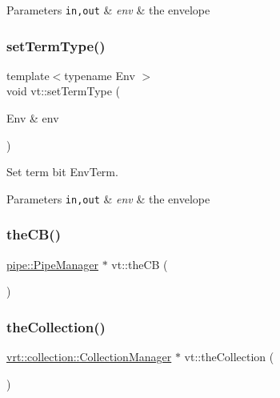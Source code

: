 \begin{DoxyParams}[1]{Parameters}
\mbox{\tt in,out}  & {\em env} & the envelope \\
\hline
\end{DoxyParams}
\mbox{\label{namespacevt_aa42d7e0adc8b283dd10602ece422699d}} 
\subsubsection{\texorpdfstring{set\+Term\+Type()}{setTermType()}}
{\footnotesize\ttfamily template$<$typename Env $>$ \\
void vt\+::set\+Term\+Type (\begin{DoxyParamCaption}\item[{Env \&}]{env }\end{DoxyParamCaption})\hspace{0.3cm}{\ttfamily [inline]}}



Set term bit {\ttfamily Env\+Term}. 


\begin{DoxyParams}[1]{Parameters}
\mbox{\tt in,out}  & {\em env} & the envelope \\
\hline
\end{DoxyParams}
\mbox{\label{namespacevt_a673b109e94c7bca58313504c83e1da94}} 
\subsubsection{\texorpdfstring{the\+C\+B()}{theCB()}}
{\footnotesize\ttfamily \hyperlink{structvt_1_1pipe_1_1_pipe_manager}{pipe\+::\+Pipe\+Manager} $\ast$ vt\+::the\+CB (\begin{DoxyParamCaption}{ }\end{DoxyParamCaption})}

\mbox{\label{namespacevt_a1c45ce63bfd2c327ff7d76a319a371d8}} 
\subsubsection{\texorpdfstring{the\+Collection()}{theCollection()}}
{\footnotesize\ttfamily \hyperlink{structvt_1_1vrt_1_1collection_1_1_collection_manager}{vrt\+::collection\+::\+Collection\+Manager} $\ast$ vt\+::the\+Collection (\begin{DoxyParamCaption}{ }\end{DoxyParamCaption})}

